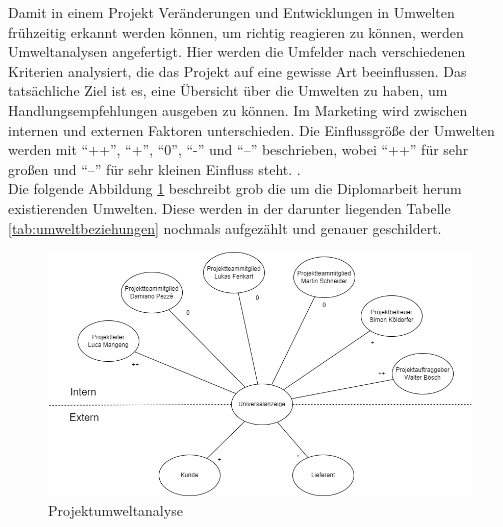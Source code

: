 Damit in einem Projekt Veränderungen und Entwicklungen in Umwelten frühzeitig erkannt werden können, um richtig reagieren zu können, werden Umweltanalysen angefertigt. Hier werden die Umfelder nach verschiedenen Kriterien analysiert, die das Projekt auf eine gewisse Art beeinflussen. Das tatsächliche Ziel ist es, eine Übersicht über die Umwelten zu haben, um Handlungsempfehlungen ausgeben zu können. Im Marketing wird zwischen internen und externen Faktoren unterschieden. Die Einflussgröße der Umwelten werden mit \enquote{++}, \enquote{+}, \enquote{0}, \enquote{-} und \enquote{--} beschrieben, wobei \enquote{++} für sehr großen und \enquote{--} für sehr kleinen Einfluss steht. \cite[vgl.][]{Wikipedia:2023, Redaktion:2024}. \\
Die folgende Abbildung \ref{fig:umweltanalyse} beschreibt grob die um die Diplomarbeit herum existierenden Umwelten. Diese werden in der darunter liegenden Tabelle \ref{tab:umweltbeziehungen} nochmals aufgezählt und genauer geschildert.

\begin{figure}[H]
	\centering
	\includegraphics[width=15cm]{Bilder/pua.png}
	\caption{Projektumweltanalyse}
	\label{fig:umweltanalyse}
\end{figure}

